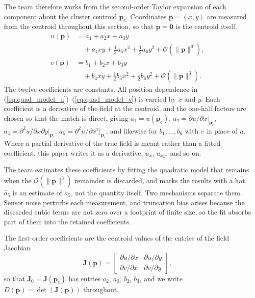 \documentclass[lettersize,journal]{IEEEtran}
\begin{document}
The team therefore works from the second-order Taylor expansion of each
component about the cluster centroid $\mathbf{p}_c$. Coordinates
$\mathbf{p} = (x, y)$ are measured from the centroid throughout this
section, so that $\mathbf{p} = \mathbf{0}$ is the centroid itself.
\begin{align}
    u(\mathbf{p}) &= a_1 + a_2 x + a_3 y
        \nonumber \\
        &\quad + a_4 xy + \tfrac{1}{2} a_5 x^2 + \tfrac{1}{2} a_6 y^2
        + \mathcal{O}(\|\mathbf{p}\|^3),
        \label{eq:quad_model_u} \\
    v(\mathbf{p}) &= b_1 + b_2 x + b_3 y
        \nonumber \\
        &\quad + b_4 xy + \tfrac{1}{2} b_5 x^2 + \tfrac{1}{2} b_6 y^2
        + \mathcal{O}(\|\mathbf{p}\|^3).
        \label{eq:quad_model_v}
\end{align}
The twelve coefficients are constants. All position dependence in
(\ref{eq:quad_model_u})--(\ref{eq:quad_model_v}) is carried by $x$ and
$y$. Each coefficient is a derivative of the field at the centroid, and
the one-half factors are chosen so that the match is direct, giving
$a_1 = u(\mathbf{p}_c)$, $a_2 = \partial u/\partial x|_{\mathbf{p}_c}$,
$a_4 = \partial^2 u/\partial x \partial y|_{\mathbf{p}_c}$,
$a_5 = \partial^2 u/\partial x^2|_{\mathbf{p}_c}$, and likewise for
$b_1, \ldots, b_6$ with $v$ in place of $u$. Where a partial derivative
of the true field is meant rather than a fitted coefficient, this paper
writes it as a derivative, $u_x$, $u_{xy}$, and so on.

The team estimates these coefficients by fitting the quadratic model that
remains when the $\mathcal{O}(\|\mathbf{p}\|^3)$ remainder is discarded,
and marks the results with a hat. $\hat{a}_5$ is an estimate of $a_5$,
not the quantity itself. Two mechanisms separate them. Sensor
noise perturbs each measurement, and truncation bias arises because the
discarded cubic terms are not zero over a footprint of finite size, so the
fit absorbs part of them into the retained coefficients.

The first-order coefficients are the centroid values of the entries of the
field Jacobian
\begin{equation}
    \mathbf{J}(\mathbf{p}) =
    \begin{bmatrix}
        \partial u / \partial x & \partial u / \partial y \\
        \partial v / \partial x & \partial v / \partial y
    \end{bmatrix},
\end{equation}
so that $\mathbf{J}_0 = \mathbf{J}(\mathbf{p}_c)$ has entries $a_2$,
$a_3$, $b_2$, $b_3$, and we write $D(\mathbf{p}) =
\det(\mathbf{J}(\mathbf{p}))$ throughout. 
\end{document}
